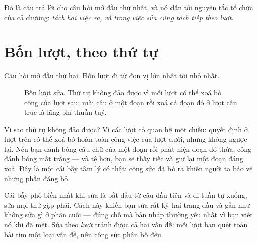\documentclass[../../english.tex]{subfiles}
\begin{document}
Đó là câu trả lời cho câu hỏi mở đầu thứ nhất, và nó dẫn tới nguyên tắc tổ chức của cả chương: \emph{tách hai việc ra, và trong việc sửa cũng tách tiếp theo lượt}.

\section{Bốn lượt, theo thứ tự}

Câu hỏi mở đầu thứ hai. Bốn lượt đi từ đơn vị lớn nhất tới nhỏ nhất.

\begin{figure}[H]\centering
{}
\caption{Bốn lượt sửa. Thứ tự không đảo được vì mỗi lượt có thể xoá bỏ công của lượt sau: mài câu ở một đoạn rồi xoá cả đoạn đó ở lượt cấu trúc là lãng phí thuần tuý.}
\label{fig:bon-luot-sua}
\end{figure}

Vì sao thứ tự không đảo được? Vì các lượt có quan hệ một chiều: quyết định ở lượt trên có thể xoá bỏ hoàn toàn công việc của lượt dưới, nhưng không ngược lại. Nếu bạn đánh bóng câu chữ của một đoạn rồi phát hiện đoạn đó thừa, công đánh bóng mất trắng --- và tệ hơn, bạn sẽ thấy tiếc và giữ lại một đoạn đáng xoá. Đây là một cái bẫy tâm lý có thật: công sức đã bỏ ra khiến người ta bảo vệ những phần đáng bỏ.

\begin{cambay}
Cái bẫy phổ biến nhất khi sửa là bắt đầu từ câu đầu tiên và đi tuần tự xuống, sửa mọi thứ gặp phải. Cách này khiến bạn sửa rất kỹ hai trang đầu và gần như không sửa gì ở phần cuối --- đúng chỗ mà bản nháp thường yếu nhất vì bạn viết nó khi đã mệt. Sửa theo \emph{lượt} tránh được cả hai vấn đề: mỗi lượt bạn quét toàn bài tìm một loại vấn đề, nên công sức phân bố đều.
\end{cambay}
\end{document}
